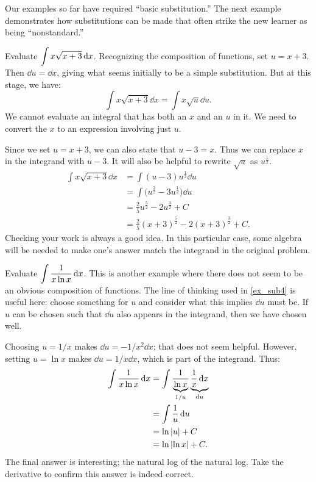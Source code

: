 Our examples so far have required ``basic substitution.'' The next example demonstrates how substitutions can be made that often strike the new learner as being ``nonstandard.''

\begin{example}\label{ex_sub4}%
Evaluate $\displaystyle\int x\sqrt{x+3}\operatorname{d}\! x$.
\solution
Recognizing the composition of functions, set $u = x+3$. Then $\dd u = \dd x$, giving what seems initially to be a simple substitution. But at this stage, we have:\vspace{-.3\baselineskip}
	\[\int x\sqrt{x+3}\dd x = \int x\sqrt{u}\dd u.\]
We cannot evaluate an integral that has both an $x$ and an $u$ in it. We need to convert the $x$ to an expression involving just $u$.

Since we set $u = x+3$, we can also state that $u-3 = x$. Thus we can replace $x$ in the integrand with $u-3$. It will also be helpful to rewrite $\sqrt{u}$ as $u^\frac12$.
\begin{align*}
	\int x\sqrt{x+3} \dd x
	&= \int (u-3)u^\frac12\dd u \\
	&= \int \bigl(u^\frac32 - 3u^\frac12\bigr) \dd u \\
	&= \frac25u^\frac52 - 2u^\frac32 + C \\
	&= \frac25(x+3)^\frac52 - 2(x+3)^\frac32 + C.
\end{align*}
Checking your work is always a good idea. In this particular case, some algebra will be needed to make one's answer match the integrand in the original problem.
\end{example}

\begin{example}\label{ex_sub5}%
Evaluate $\displaystyle \int \frac{1}{x\ln x}\operatorname{d}\! x$.
\solution
This is another example where there does not seem to be an obvious composition of functions. The line of thinking used in \autoref{ex_sub4} is useful here: choose something for $u$ and consider what this implies $\dd u$ must be. If $u$ can be chosen such that $\dd u$ also appears in the integrand, then we have chosen well.

Choosing $u = 1/x$ makes $\dd u = -1/x^2\dd x$; that does not seem helpful. However, setting $u = \ln x$ makes $\dd u = 1/x\dd x$, which is part of the integrand. Thus:
\begin{align*}
	\int \frac1{x\ln x}\operatorname{d}\! x
	&= \int \frac{1}{\underbrace{\ln x}_{1/u}}\underbrace{\frac1x\operatorname{d}\! x}_{\operatorname{d}\! u} \\
	&= \int \frac1u\operatorname{d}\! u \\
	&= \ln \left\lvert u \right\rvert + C \\
	&= \ln \left\lvert \ln x \right\rvert + C.
\end{align*}
The final answer is interesting; the natural log of the natural log. Take the derivative to confirm this answer is indeed correct.
\end{example}

